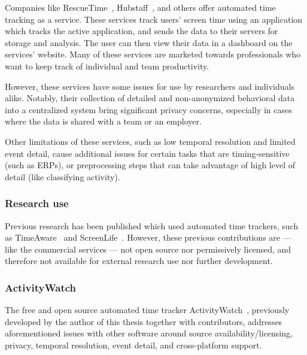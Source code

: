         Companies like RescueTime~\cite{noauthor_rescuetime_nodate}, Hubstaff~\cite{noauthor_hubstaff_nodate}, and others offer automated time tracking as a service. These services track users' screen time using an application which tracks the active application, and sends the data to their servers for storage and analysis. The user can then view their data in a dashboard on the services' website. Many of these services are marketed towards professionals who want to keep track of individual and team productivity.

        However, these services have some issues for use by researchers and individuals alike. Notably, their collection of detailed and non-anonymized behavioral data into a centralized system bring significant privacy concerns, especially in cases where the data is shared with a team or an employer.

        Other limitations of these services, such as low temporal resolution and limited event detail, cause additional issues for certain tasks that are timing-sensitive (such as ERPs), or preprocessing steps that can take advantage of high level of detail (like classifying activity).

    \subsubsection*{Research use}

        Previous research has been published which used automated time trackers, such as TimeAware~\cite{kim_timeaware_2016} and ScreenLife~\cite{rooksby_personal_2016}. However, these previous contributions are --- like the commercial services --- not open source nor permissively licensed, and therefore not available for external research use nor further development.

    \subsubsection*{ActivityWatch}

        The free and open source automated time tracker ActivityWatch~\cite{bjareholt_activitywatch_2020}, previously developed by the author of this thesis together with contributors, addresses aforementioned issues with other software around source availability/licensing, privacy, temporal resolution, event detail, and cross-platform support.


